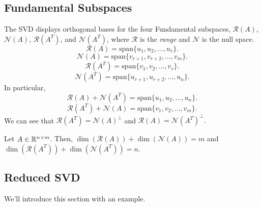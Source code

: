 \documentclass[letterpaper]{article}
\newcommand{\0}{\mathbf{0}}
\begin{document}
\subsection{Fundamental Subspaces}
The SVD displays orthogonal bases for the four Fundamental subspaces, $\mathcal{R}(A)$, $\mathcal{N}(A)$, $\mathcal{R}(A^T)$, and $\mathcal{N}(A^T)$, where $\mathcal{R}$ is the \emph{range} and $\mathcal{N}$ is the null space. 
\[\mathcal{R}(A) = \text{span}\{u_1, u_2, \hdots, u_r\}.\]
\[\mathcal{N}(A) = \text{span}\{v_{r + 1}, v_{r + 2}, \hdots, v_m\}.\]
\[\mathcal{R}(A^T) = \text{span}\{v_1, v_2, \hdots, v_r\}.\]
\[\mathcal{N}(A^T) = \text{span}\{u_{r + 1}, u_{r + 2}, \hdots, u_n\}.\]
In particular, 
\[\mathcal{R}(A) + \mathcal{N}(A^T) = \text{span}\{u_1, u_2, \hdots, u_n\}.\]
\[\mathcal{R}(A^T) + \mathcal{N}(A) = \text{span}\{v_1, v_2, \hdots, v_m\}.\]
We can see that $\mathcal{R}(A^T) = \mathcal{N}(A)^{\perp}$ and $\mathcal{R}(A) = \mathcal{N}(A^T)^{\perp}.$

\begin{corollary}{}{}
    Let $A \in \mathbb{R}^{n \times m}$. Then, $\dim(\mathcal{R}(A)) + \dim(\mathcal{N}(A)) = m$ and $\dim(\mathcal{R}(A^T)) + \dim(\mathcal{N}(A^T)) = n$.
\end{corollary}

\subsection{Reduced SVD}
We'll introduce this section with an example. 
\end{document}
